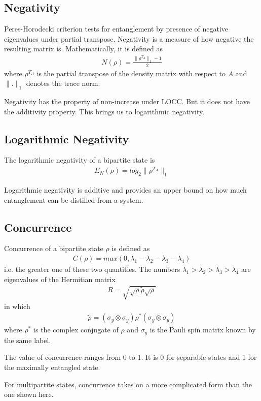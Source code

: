 \subsection{Negativity}
\par Peres-Horodecki criterion tests for entanglement by presence of negative eigenvalues under partial transpose. Negativity is a measure of how negative the resulting matrix is. Mathematically, it is defined as
\begin{align*}
N(\rho) = \frac{\lVert \rho^{T_A} \rVert_1 - 1}{2}
\end{align*}
where $\rho^{T_A}$ is the partial transpose of the density matrix with respect to $A$ and $\lVert . \rVert_1$ denotes the trace norm.
\par Negativity has the property of non-increase under LOCC. But it does not have the additivity property. This brings us to logarithmic negativity.

\subsection{Logarithmic Negativity}
\par The logarithmic negativity of a bipartite state is
\begin{align*}
E_N(\rho) = log_2 \lVert \rho^{T_A} \rVert_1
\end{align*}
\par Logarithmic negativity is additive and provides an upper bound on how much entanglement can be distilled from a system.

\subsection{Concurrence}
\par Concurrence of a bipartite state $\rho$ is defined as
\begin{align*}
C(\rho) = max(0, \lambda_1 - \lambda_2 - \lambda_3 - \lambda_4)
\end{align*}
i.e. the greater one of these two quantities. The numbers $\lambda_1 > \lambda_2 > \lambda_3 > \lambda_4$ are eigenvalues of the Hermitian matrix
\begin{align*}
R = \sqrt{ \sqrt{\rho} \tilde{\rho} \sqrt{\rho} }
\end{align*}
in which
\begin{align*}
\tilde{\rho} = ( \sigma_y \otimes \sigma_y ) \rho^* ( \sigma_y \otimes \sigma_y )
\end{align*}
where $\rho^*$ is the complex conjugate of $\rho$ and $\sigma_y$ is the Pauli spin matrix known by the same label.
\par The value of concurrence ranges from 0 to 1. It is 0 for separable states and 1 for the maximally entangled state.
\par For multipartite states, concurrence takes on a more complicated form than the one shown here.

